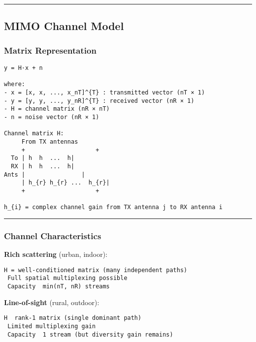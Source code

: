 \begin{center}\rule{0.5\linewidth}{0.5pt}\end{center}

\subsection{\texorpdfstring{ MIMO Channel
Model}{ MIMO Channel Model}}\label{mimo-channel-model}

\subsubsection{Matrix Representation}\label{matrix-representation}

\begin{verbatim}
y = H·x + n

where:
- x = [x, x, ..., x_nT]^{T} : transmitted vector (nT × 1)
- y = [y, y, ..., y_nR]^{T} : received vector (nR × 1)
- H = channel matrix (nR × nT)
- n = noise vector (nR × 1)

Channel matrix H:
     From TX antennas 
     +                    +
  To | h  h  ...  h|
  RX | h  h  ...  h|
Ants |                |
     | h_{r} h_{r} ...  h_{r}|
     +                    +

h_{i} = complex channel gain from TX antenna j to RX antenna i
\end{verbatim}

\begin{center}\rule{0.5\linewidth}{0.5pt}\end{center}

\subsubsection{Channel Characteristics}\label{channel-characteristics}

\textbf{Rich scattering} (urban, indoor):

\begin{verbatim}
H = well-conditioned matrix (many independent paths)
 Full spatial multiplexing possible
 Capacity  min(nT, nR) streams
\end{verbatim}

\textbf{Line-of-sight} (rural, outdoor):

\begin{verbatim}
H  rank-1 matrix (single dominant path)
 Limited multiplexing gain
 Capacity  1 stream (but diversity gain remains)
\end{verbatim}

